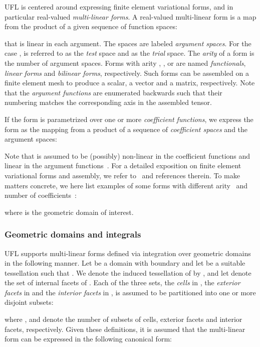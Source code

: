 \documentclass[prodmode,acmtoms]{acmsmall}
\begin{document}
UFL is centered around expressing finite element variational forms,
and in particular real-valued \emph{multi-linear forms}. A real-valued
multi-linear form  is a map from the product of a given sequence
 of function spaces:

that is linear in each argument. The spaces  are labeled
\emph{argument spaces}. For the case ,  is referred
to as the \emph{test} space and  as the \emph{trial} space.  The
\emph{arity} of a form  is the number of argument spaces. Forms
with arity , , or  are named \emph{functionals},
\emph{linear forms} and \emph{bilinear forms}, respectively. Such
forms can be assembled on a finite element mesh to produce a scalar, a
vector and a matrix, respectively.  Note that the \emph{argument
  functions}  are enumerated backwards
such that their numbering matches the corresponding axis in the
assembled tensor.

If the form  is parametrized over one or more \emph{coefficient
  functions}, we express the form as the mapping from a product of a
sequence  of \emph{coefficient spaces} and the
argument spaces:

Note that  is assumed to be (possibly) non-linear in the
coefficient functions  and linear in the argument
functions~. For a detailed exposition on finite element
variational forms and assembly, we refer to~\citep{KirbyLogg2012} and
references therein. To make matters concrete, we here list examples of
some forms with different arity~ and number of coefficients~:

where  is the geometric domain of interest.

\subsubsection{Geometric domains and integrals}
\label{subsubsec:geometric_domains_and_integrals}

UFL supports multi-linear forms defined via integration over geometric
domains in the following manner. Let  be a domain
with boundary  and let  be
a suitable tessellation such that . We denote the induced tessellation of  by
, and let  denote the set of
internal facets of . Each of the three sets, the
\emph{cells} in , the \emph{exterior facets} in
 and the \emph{interior facets} in , is
assumed to be partitioned into one or more disjoint subsets:

where ,  and  denote the number of subsets of
cells, exterior facets and interior facets, respectively. Given these
definitions, it is assumed that the multi-linear form can be expressed
in the following canonical form:
\end{document}
